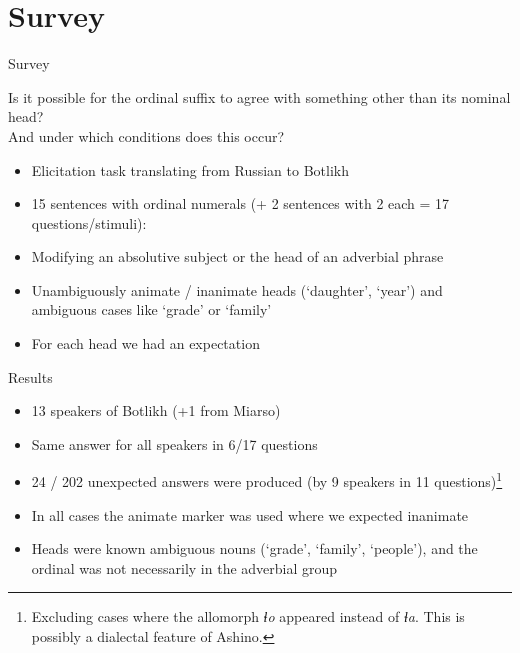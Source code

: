 \section{Survey}
\begin{frame}{Survey}

\begin{center}
Is it possible for the ordinal suffix to agree with something other than its nominal head?\\
\pause
And under which conditions does this occur?
\end{center}

\pause

\begin{itemize}
\item Elicitation task translating from Russian to Botlikh
\item 15 sentences with ordinal numerals (+ 2 sentences with 2 each = 17 questions/stimuli):
\item Modifying an absolutive subject or the head of an adverbial phrase
\item Unambiguously animate / inanimate heads (`daughter', `year') and ambiguous cases
like `grade’ or `family’
\item For each head we had an expectation
\end{itemize}

\end{frame}

\begin{frame}{Results}

\begin{itemize}
\item 13 speakers of Botlikh (+1 from Miarso)
\item Same answer for all speakers in 6/17 questions
\item 24 / 202 unexpected answers were produced (by 9 speakers in 11 questions)\footnote{\footnotesize{Excluding cases where the allomorph \textit{ɬo} appeared instead of \textit{ɬa}. This is possibly a dialectal feature of Ashino.}}
\pause
\item In all cases the animate marker was used where we expected inanimate
\item Heads were known ambiguous nouns (`grade', `family', `people'), and the ordinal was not necessarily in the adverbial group
\end{itemize}
\end{frame}

